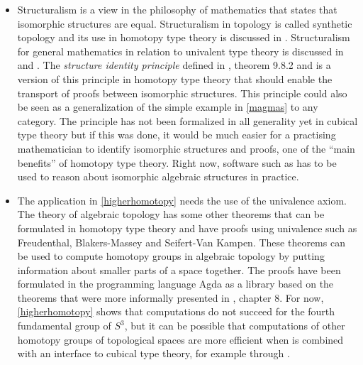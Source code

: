 \documentclass[12pt,a4paper,twoside,xetex]{book} %
\newcommand{\keyword}[1]{\emph{#1}\index{#1}}
\begin{document}
\begin{itemize}
\item Structuralism is a view in the philosophy of mathematics that states that isomorphic structures are equal. Structuralism in topology is called synthetic topology and its use in homotopy type theory is discussed in \cite{Shulman2017}. Structuralism for general mathematics in relation to univalent type theory is discussed in \cite{Awodey2014} and \cite{Tsementzis2016}. The \keyword{structure identity principle} defined in 
\cite{Voevodsky2013}, theorem 9.8.2 and \cite{Aczel2012} is a version of this principle in homotopy type theory that should enable the transport of proofs between isomorphic structures. This principle could also be seen as a 
generalization of the simple example in \cref{magmas} to any category. The 
principle has not been formalized in all generality yet in cubical type theory 
but if this was done, it would be much easier for a practising mathematician to 
identify isomorphic structures and proofs, one of the ``main benefits'' of homotopy type theory. Right now, software such as \cite{TheGAPGroup2018} has to be used to reason about isomorphic algebraic structures in practice. 

\item The application in \cref{higherhomotopy} needs the use of the univalence 
axiom. The theory of algebraic topology has some other theorems that can be 
formulated in homotopy type theory and have proofs using univalence such as 
Freudenthal, Blakers-Massey and Seifert-Van Kampen. These theorems can be used 
to compute homotopy groups in algebraic topology by putting information about 
smaller parts of a space together. The proofs have been formulated in the 
programming language Agda as a library \cite{HoBr17} based on the theorems that 
were more informally presented in \cite{Voevodsky2013}, chapter 8. For now, 
\cref{higherhomotopy} shows that computations do not succeed for the fourth 
fundamental group of $S^3$, but it can be possible that computations of other 
homotopy groups of topological spaces are more efficient when \cite{HoBr17} is 
combined with an interface to cubical type theory, for example through 
\cite{Moertberg2018}.



\end{itemize}
\end{document}
